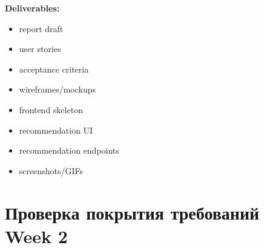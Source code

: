 \documentclass[12pt,a4paper]{article}
\begin{document}
\textbf{Deliverables:}
\begin{itemize}
    \item report draft
    \item user stories
    \item acceptance criteria
    \item wireframes/mockups
    \item frontend skeleton
    \item recommendation UI
    \item recommendation endpoints
    \item screenshots/GIFs
\end{itemize}

\section{Проверка покрытия требований Week 2}
\end{document}
